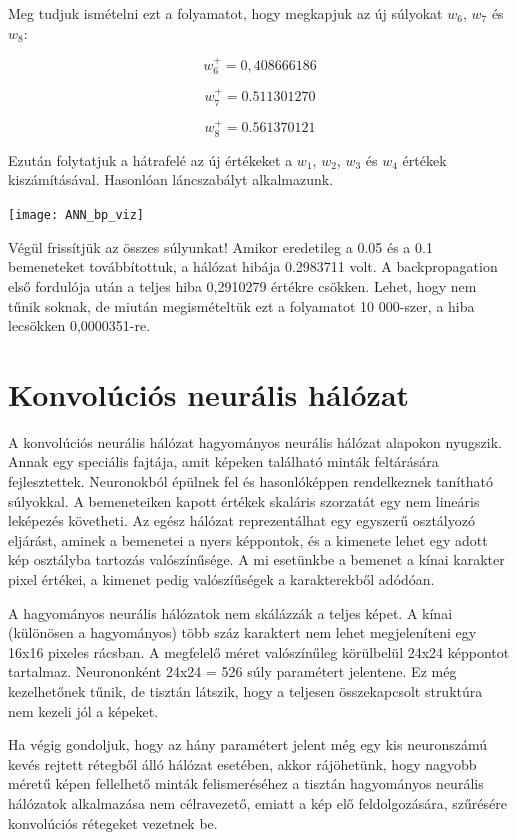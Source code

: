 Meg tudjuk ismételni ezt a folyamatot, hogy megkapjuk az új súlyokat $w_6$, $w_7$ és $w_8$:

\[w_6 ^ {+} = 0,408666186\]

\[w_7 ^ {+} = 0.511301270\]

\[w_8 ^ {+} = 0.561370121\]

Ezután folytatjuk a hátrafelé az új értékeket a $w_1$, $w_2$, $w_3$ és $w_4$ értékek kiszámításával. Hasonlóan láncszabályt alkalmazunk.\\

\begin{center}
\texttt{[image: ANN\_bp\_viz]}
\end{center}

Végül frissítjük az összes súlyunkat! Amikor eredetileg a 0.05 és a 0.1 bemeneteket továbbítottuk, a hálózat hibája 0.2983711 volt. A backpropagation első fordulója után a teljes hiba 0,2910279 értékre csökken. Lehet, hogy nem tűnik soknak, de miután megismételtük ezt a folyamatot 10 000-szer, a hiba lecsökken 0,0000351-re.\\

\section{Konvolúciós neurális hálózat}

A konvolúciós neurális hálózat hagyományos neurális hálózat alapokon nyugszik. Annak egy speciális fajtája, amit képeken található minták feltárására fejlesztettek. Neuronokból épülnek fel és hasonlóképpen rendelkeznek tanítható súlyokkal. A bemeneteiken kapott értékek skaláris szorzatát egy nem lineáris leképezés követheti. Az egész hálózat reprezentálhat egy egyszerű osztályozó eljárást, aminek a bemenetei a nyers képpontok, és a kimenete lehet egy adott kép osztályba tartozás valószínűsége. A mi esetünkbe a bemenet a kínai karakter pixel értékei, a kimenet pedig valószíűségek a karakterekből adódóan.

A hagyományos neurális hálózatok nem skálázzák a teljes képet. A kínai (különösen a hagyományos) több száz karaktert nem lehet megjeleníteni egy 16x16 pixeles rácsban. A megfelelő méret valószínűleg körülbelül 24x24 képpontot tartalmaz. Neurononként 24x24 = 526 súly paramétert jelentene. Ez még kezelhetőnek tűnik, de tisztán látszik, hogy a teljesen összekapcsolt struktúra nem kezeli jól a képeket.

Ha végig gondoljuk, hogy az hány paramétert jelent még egy kis neuronszámú kevés rejtett rétegből álló hálózat esetében, akkor rájöhetünk, hogy nagyobb méretű képen fellelhető minták felismeréséhez a tisztán hagyományos neurális hálózatok alkalmazása nem célravezető, emiatt a kép elő feldolgozására, szűrésére konvolúciós rétegeket vezetnek be.

